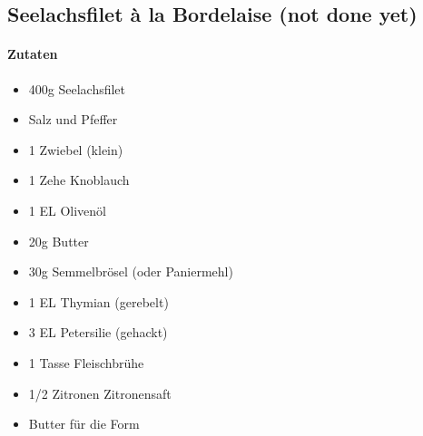 \newpage
\subsection{Seelachsfilet à la Bordelaise (not done yet)}
\paragraph{Zutaten}
\begin{itemize}[noitemsep]
	\item 400g Seelachsfilet
	\item Salz und Pfeffer
	\item 1 Zwiebel (klein)
	\item 1 Zehe Knoblauch
	\item 1 EL Olivenöl
	\item 20g Butter
	\item 30g Semmelbrösel (oder Paniermehl)
	\item 1 EL Thymian (gerebelt)
	\item 3 EL Petersilie (gehackt)
	\item 1 Tasse Fleischbrühe 
	\item 1/2 Zitronen Zitronensaft
	\item Butter für die Form
\end{itemize}
